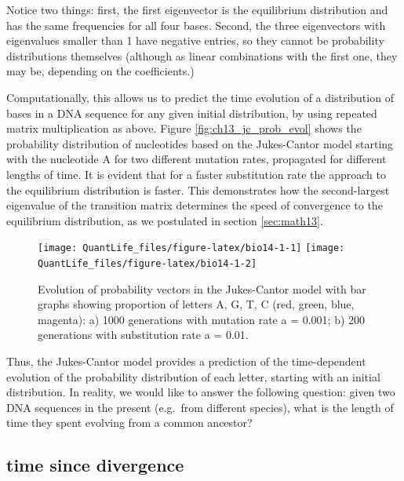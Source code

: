\documentclass[
]{book}
\theoremstyle{definition}
\theoremstyle{definition}
\theoremstyle{definition}
\theoremstyle{remark}
\begin{document}
Notice two things: first, the first eigenvector is the equilibrium distribution and has the same frequencies for all four bases. Second, the three eigenvectors with eigenvalues smaller than 1 have negative entries, so they cannot be probability distributions themselves (although as linear combinations with the first one, they may be, depending on the coefficients.)

Computationally, this allows us to predict the time evolution of a distribution of bases in a DNA sequence for any given initial distribution, by using repeated matrix multiplication as above. Figure \ref{fig:ch13_jc_prob_evol} shows the probability distribution of nucleotides based on the Jukes-Cantor model starting with the nucleotide A for two different mutation rates, propagated for different lengths of time. It is evident that for a faster substitution rate the approach to the equilibrium distribution is faster. This demonstrates how the second-largest eigenvalue of the transition matrix determines the speed of convergence to the equilibrium distribution, as we postulated in section \ref{sec:math13}.

\begin{figure}
\texttt{[image: QuantLife\_files/figure-latex/bio14-1-1]} \texttt{[image: QuantLife\_files/figure-latex/bio14-1-2]} \caption{Evolution of probability vectors in the Jukes-Cantor model with bar graphs showing proportion of letters A, G, T, C (red, green, blue, magenta): a) 1000 generations with mutation rate a = 0.001; b) 200 generations with substitution rate a = 0.01.}\label{fig:bio14-1}
\end{figure}

Thus, the Jukes-Cantor model provides a prediction of the time-dependent evolution of the probability distribution of each letter, starting with an initial distribution. In reality, we would like to answer the following question: given two DNA sequences in the present (e.g.~from different species), what is the length of time they spent evolving from a common ancestor?

\hypertarget{time-since-divergence}{%
\subsection{time since divergence}\label{time-since-divergence}}
\end{document}
